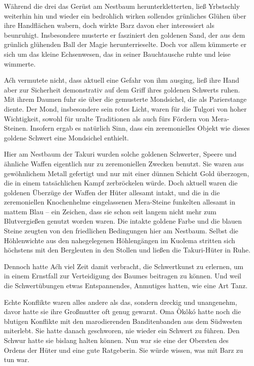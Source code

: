 Während die drei das Gerüst am Nestbaum herunterkletterten, ließ Yrbstschly weiterhin hin und wieder ein bedrohlich wirken sollendes grünliches Glühen über ihre Handflächen wabern, doch wirkte Barz davon eher interessiert als beunruhigt. Insbesondere musterte er fasziniert den goldenen Sand, der aus dem grünlich glühenden Ball der Magie herunterrieselte. Doch vor allem kümmerte er sich um das kleine Echsenwesen, das in seiner Bauchtausche ruhte und leise wimmerte.

Aćh vermutete nicht, dass aktuell eine Gefahr von ihm ausging, ließ ihre Hand aber zur Sicherheit demonstrativ auf dem Griff ihres goldenen Schwerts ruhen. Mit ihrem Daumen fuhr sie über die gemusterte Mondsichel, die als Parierstange diente. Der Mond, insbesondere sein rotes Licht, waren für die Tulgori von hoher Wichtigkeit, sowohl für uralte Traditionen als auch fürs Fördern von Mera-Steinen. Insofern ergab es natürlich Sinn, dass ein zeremonielles Objekt wie dieses goldene Schwert eine Mondsichel enthielt.

Hier am Nestbaum der Takuri wurden solche goldenen Schwerter, Speere und ähnliche Waffen eigentlich nur zu zeremoniellen Zwecken benutzt. Sie waren aus gewöhnlichem Metall gefertigt und nur mit einer dünnen Schicht Gold überzogen, die in einem tatsächlichen Kampf zerbröckelen würde. Doch aktuell waren die goldenen Überzüge der Waffen der Hüter allesamt intakt, und die in die zeremoniellen Knochenhelme eingelassenen Mera-Steine funkelten allesamt in mattem Blau – ein Zeichen, dass sie schon seit langem nicht mehr zum Blutvergießen genutzt worden waren. Die intakte goldene Farbe und die blauen Steine zeugten von den friedlichen Bedingungen hier am Nestbaum. Selbst die Höhlenwichte aus den nahegelegenen Höhlengängen im Kuolema stritten sich höchstens mit den Bergleuten in den Stollen und ließen die Takuri-Hüter in Ruhe.

Dennoch hatte Aćh viel Zeit damit verbracht, die Schwertkunst zu erlernen, um in einem Ernstfall zur Verteidigung des Baumes beitragen zu können. Und weil die Schwertübungen etwas Entspannendes, Anmutiges hatten, wie eine Art Tanz.

Echte Konflikte waren alles andere als das, sondern dreckig und unangenehm, davor hatte sie ihre Großmutter oft genug gewarnt. Oma Òkôkó hatte noch die blutigen Konflikte mit den marodierenden Banditenbanden aus dem Südwesten miterlebt. Sie hatte danach geschworen, nie wieder ein Schwert zu führen. Den Schwur hatte sie bislang halten können. Nun war sie eine der Obersten des Ordens der Hüter und eine gute Ratgeberin. Sie würde wissen, was mit Barz zu tun war.



